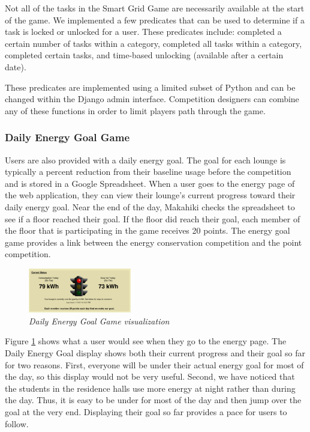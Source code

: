 \documentclass{acm_proc_article-sp}
\begin{document}
Not all of the tasks in the Smart Grid Game are necessarily available at the start of the game. We implemented a few predicates that can be used to determine if a task is locked or unlocked for a user. These predicates include: completed a certain number of tasks within a category, completed all tasks within a category, completed certain tasks, and time-based unlocking (available after a certain date).

These predicates are implemented using a limited subset of Python and can be changed within the Django admin interface. Competition designers can combine any of these functions in order to limit players path through the game.

\subsubsection{Daily Energy Goal Game}
\label{sys:goal-game}

Users are also provided with a daily energy goal. The goal for each lounge is typically a percent reduction from their baseline usage before the competition and is stored in a Google Spreadsheet. When a user goes to the energy page of the web application, they can view their lounge's current progress toward their daily energy goal. Near the end of the day, Makahiki checks the spreadsheet to see if a floor reached their goal. If the floor did reach their goal, each member of the floor that is participating in the game receives 20 points. The energy goal game provides a link between the energy conservation competition and the point competition.

\begin{figure}[t!]
  \center
  \includegraphics[width=0.4\textwidth]{daily-energy-goal-game.eps}
  \caption{\em \small Daily Energy Goal Game visualization}
  \label{fig:DailyEnergyGoal}
\end{figure}

Figure \ref{fig:DailyEnergyGoal} shows what a user would see when they go to the energy page. The Daily Energy Goal display shows both their current progress and their goal so far for two reasons. First, everyone will be under their actual energy goal for most of the day, so this display would not be very useful. Second, we have noticed that the students in the residence halls use more energy at night rather than during the day. Thus, it is easy to be under for most of the day and then jump over the goal at the very end. Displaying their goal so far provides a pace for users to follow. 
\end{document}
